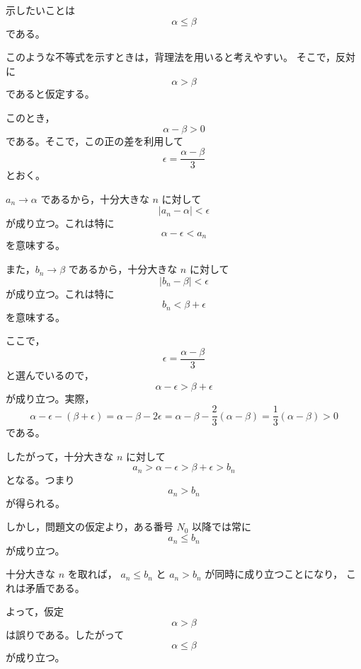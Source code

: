 \begin{strategy}
	示したいことは
	\[
	\alpha\leq \beta
	\]
	である。
	
	このような不等式を示すときは，背理法を用いると考えやすい。
	そこで，反対に
	\[
	\alpha>\beta
	\]
	であると仮定する。
	
	このとき，
	\[
	\alpha-\beta>0
	\]
	である。そこで，この正の差を利用して
	\[
	\epsilon=\frac{\alpha-\beta}{3}
	\]
	とおく。
	
	$a_n\to\alpha$ であるから，十分大きな $n$ に対して
	\[
	|a_n-\alpha|<\epsilon
	\]
	が成り立つ。これは特に
	\[
	\alpha-\epsilon<a_n
	\]
	を意味する。
	
	また，$b_n\to\beta$ であるから，十分大きな $n$ に対して
	\[
	|b_n-\beta|<\epsilon
	\]
	が成り立つ。これは特に
	\[
	b_n<\beta+\epsilon
	\]
	を意味する。
	
	ここで，
	\[
	\epsilon=\frac{\alpha-\beta}{3}
	\]
	と選んでいるので，
	\[
	\alpha-\epsilon
	>
	\beta+\epsilon
	\]
	が成り立つ。実際，
	\[
	\alpha-\epsilon-(\beta+\epsilon)
	=
	\alpha-\beta-2\epsilon
	=
	\alpha-\beta-\frac{2}{3}(\alpha-\beta)
	=
	\frac{1}{3}(\alpha-\beta)
	>0
	\]
	である。
	
	したがって，十分大きな $n$ に対して
	\[
	a_n>\alpha-\epsilon
	>
	\beta+\epsilon
	>b_n
	\]
	となる。つまり
	\[
	a_n>b_n
	\]
	が得られる。
	
	しかし，問題文の仮定より，ある番号 $N_0$ 以降では常に
	\[
	a_n\leq b_n
	\]
	が成り立つ。
	
	十分大きな $n$ を取れば，
	$a_n\leq b_n$ と $a_n>b_n$ が同時に成り立つことになり，
	これは矛盾である。
	
	よって，仮定
	\[
	\alpha>\beta
	\]
	は誤りである。したがって
	\[
	\alpha\leq\beta
	\]
	が成り立つ。
\end{strategy}
